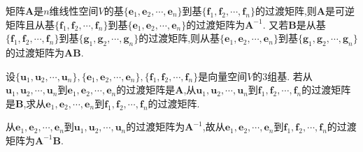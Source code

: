 \documentclass[lang=cn,newtx,10pt,scheme=chinese]{elegantbook}
\begin{document}
\begin{theorem}\label{theorem:两次基变换后的过渡矩阵}
矩阵\(\boldsymbol{A}\)是\(n\)维线性空间\(V\)的基\(\{\boldsymbol{e}_1,\boldsymbol{e}_2,\cdots,\boldsymbol{e}_n\}\)到基\(\{\boldsymbol{f}_1,\boldsymbol{f}_2,\cdots,\boldsymbol{f}_n\}\)的过渡矩阵,则\(\boldsymbol{A}\)是可逆矩阵且从基\(\{\boldsymbol{f}_1,\boldsymbol{f}_2,\cdots,\boldsymbol{f}_n\}\)到基\(\{\boldsymbol{e}_1,\boldsymbol{e}_2,\cdots,\boldsymbol{e}_n\}\)的过渡矩阵为\(\boldsymbol{A}^{-1}\). 又若\(\boldsymbol{B}\)是从基\(\{\boldsymbol{f}_1,\boldsymbol{f}_2,\cdots,\boldsymbol{f}_n\}\)到基\(\{\boldsymbol{g}_1,\boldsymbol{g}_2,\cdots,\boldsymbol{g}_n\}\)的过渡矩阵,则从基\(\{\boldsymbol{e}_1,\boldsymbol{e}_2,\cdots,\boldsymbol{e}_n\}\)到基\(\{\boldsymbol{g}_1,\boldsymbol{g}_2,\cdots,\boldsymbol{g}_n\}\)的过渡矩阵为\(\boldsymbol{A}\boldsymbol{B}\).
\end{theorem}

\begin{example}
设\(\{\boldsymbol{u}_1,\boldsymbol{u}_2,\cdots,\boldsymbol{u}_n\},\{\boldsymbol{e}_1,\boldsymbol{e}_2,\cdots,\boldsymbol{e}_n\},\{\boldsymbol{f}_1,\boldsymbol{f}_2,\cdots,\boldsymbol{f}_n\}\)是向量空间\(V\)的3组基. 若从\(\boldsymbol{u}_1,\boldsymbol{u}_2,\cdots,\boldsymbol{u}_n\)到\(\boldsymbol{e}_1,\boldsymbol{e}_2,\cdots,\boldsymbol{e}_n\)的过渡矩阵是\(\boldsymbol{A}\),从\(\boldsymbol{u}_1,\boldsymbol{u}_2,\cdots,\boldsymbol{u}_n\)到\(\boldsymbol{f}_1,\boldsymbol{f}_2,\cdots,\boldsymbol{f}_n\)的过渡矩阵是\(\boldsymbol{B}\),求从\(\boldsymbol{e}_1,\boldsymbol{e}_2,\cdots,\boldsymbol{e}_n\)到\(\boldsymbol{f}_1,\boldsymbol{f}_2,\cdots,\boldsymbol{f}_n\)的过渡矩阵.
\end{example}
\begin{solution}
从\(\boldsymbol{e}_1,\boldsymbol{e}_2,\cdots,\boldsymbol{e}_n\)到\(\boldsymbol{u}_1,\boldsymbol{u}_2,\cdots,\boldsymbol{u}_n\)的过渡矩阵为\(\boldsymbol{A}^{-1}\),故从\(\boldsymbol{e}_1,\boldsymbol{e}_2,\cdots,\boldsymbol{e}_n\)到\(\boldsymbol{f}_1,\boldsymbol{f}_2,\cdots,\boldsymbol{f}_n\)的过渡矩阵为\(\boldsymbol{A}^{-1}\boldsymbol{B}\).
\end{solution}
\end{document}
